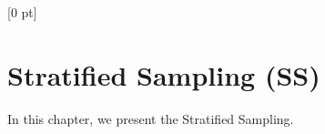\titlespacing{\chapter}{0 pt}{30 pt}{50 pt}[0 pt]
\titleformat{\section}{\Large\bfseries}{\thesection}{0 pt}{\hspace{30 pt}}
\titleformat{\subsection}{\large\bfseries}{\thesubsection}{0 pt}{\hspace{30 pt}}
\pagestyle{fancy}
\fancyhead[LO,LE]{\footnotesize\emph{\leftmark}}
\fancyhead[RO,RE]{\thepage}
\fancyfoot[CO,CE]{}
\newcommand{\tabitem}{~~\llap{\textbullet}~~}

\chapter{Stratified Sampling (SS)} %

\normalsize
\noindent
In this chapter, we present the Stratified Sampling. \\



\clearpage